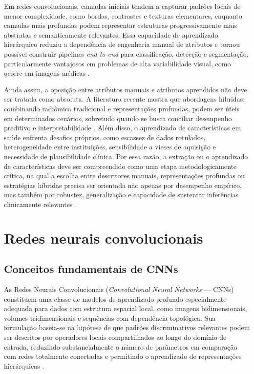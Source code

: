 \documentclass[tcc,capa]{texufpel}
\begin{document}
Em redes convolucionais, camadas iniciais tendem a capturar padrões locais de menor complexidade, como bordas, contrastes e texturas elementares, enquanto camadas mais profundas podem representar estruturas progressivamente mais abstratas e semanticamente relevantes. Essa capacidade de aprendizado hierárquico reduziu a dependência de engenharia manual de atributos e tornou possível construir pipelines \textit{end-to-end} para classificação, detecção e segmentação, particularmente vantajosos em problemas de alta variabilidade visual, como ocorre em imagens médicas \cite{Lee2017,Lambin2020}.

Ainda assim, a oposição entre atributos manuais e atributos aprendidos não deve ser tratada como absoluta. A literatura recente mostra que abordagens híbridas, combinando radiômica tradicional e representações profundas, podem ser úteis em determinados cenários, sobretudo quando se busca conciliar desempenho preditivo e interpretabilidade \cite{Lambin2020,Ce2024}. Além disso, o aprendizado de características em saúde enfrenta desafios próprios, como escassez de dados rotulados, heterogeneidade entre instituições, sensibilidade a vieses de aquisição e necessidade de plausibilidade clínica. Por essa razão, a extração ou o aprendizado de características deve ser compreendido como uma etapa metodologicamente crítica, na qual a escolha entre descritores manuais, representações profundas ou estratégias híbridas precisa ser orientada não apenas por desempenho empírico, mas também por robustez, generalização e capacidade de sustentar inferências clinicamente relevantes \cite{Cobo2023,Lee2017}.

\section{Redes neurais convolucionais}

\subsection{Conceitos fundamentais de CNNs}

As Redes Neurais Convolucionais (\textit{Convolutional Neural Networks} --- CNNs) constituem uma classe de modelos de aprendizado profundo especialmente adequada para dados com estrutura espacial local, como imagens bidimensionais, volumes tridimensionais e sequências com dependência topológica. Sua formulação baseia-se na hipótese de que padrões discriminativos relevantes podem ser descritos por operadores locais compartilhados ao longo do domínio de entrada, reduzindo substancialmente o número de parâmetros em comparação com redes totalmente conectadas e permitindo o aprendizado de representações hierárquicas \cite{LeCun1998,Goodfellow2016,Szeliski2022}.
\end{document}
